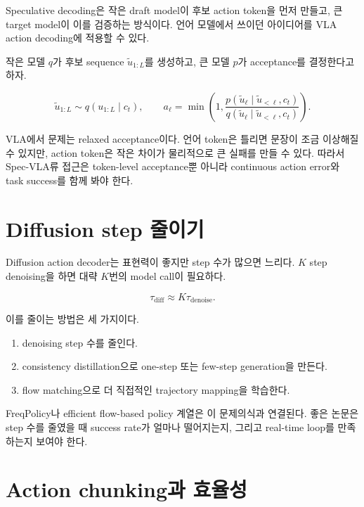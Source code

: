 Speculative decoding은 작은 draft model이 후보 action token을 먼저 만들고, 큰 target model이 이를 검증하는 방식이다. 언어 모델에서 쓰이던 아이디어를 VLA action decoding에 적용할 수 있다.

작은 모델 $q$가 후보 sequence $\tilde{u}_{1:L}$를 생성하고, 큰 모델 $p$가 acceptance를 결정한다고 하자.

\begin{equation}
  \tilde{u}_{1:L} \sim q(u_{1:L}\mid c_t),
  \qquad
  a_\ell =
  \min\left(1,
  \frac{p(\tilde{u}_\ell \mid \tilde{u}_{<\ell},c_t)}
       {q(\tilde{u}_\ell \mid \tilde{u}_{<\ell},c_t)}
  \right).
\end{equation}

VLA에서 문제는 relaxed acceptance이다. 언어 token은 틀리면 문장이 조금 이상해질 수 있지만, action token은 작은 차이가 물리적으로 큰 실패를 만들 수 있다. 따라서 Spec-VLA류 접근은 token-level acceptance뿐 아니라 continuous action error와 task success를 함께 봐야 한다.

\section{Diffusion step 줄이기}

Diffusion action decoder는 표현력이 좋지만 step 수가 많으면 느리다. $K$ step denoising을 하면 대략 $K$번의 model call이 필요하다.

\begin{equation}
  \tau_{\mathrm{diff}}
  \approx
  K \tau_{\mathrm{denoise}}.
\end{equation}

이를 줄이는 방법은 세 가지이다.

\begin{enumerate}
  \item denoising step 수를 줄인다.
  \item consistency distillation으로 one-step 또는 few-step generation을 만든다.
  \item flow matching으로 더 직접적인 trajectory mapping을 학습한다.
\end{enumerate}

FreqPolicy나 efficient flow-based policy 계열은 이 문제의식과 연결된다. 좋은 논문은 step 수를 줄였을 때 success rate가 얼마나 떨어지는지, 그리고 real-time loop를 만족하는지 보여야 한다.

\section{Action chunking과 효율성}

